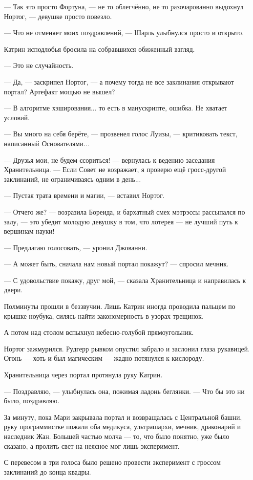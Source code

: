 --- Так это просто Фортуна, --- не то облегчённо, не то разочарованно выдохнул Нортог,
--- девушке просто повезло.

--- Что не отменяет моих поздравлений, --- Шарль улыбнулся просто и открыто.

Катрин исподлобья бросила на собравшихся обиженный взгляд.

--- Это не случайность.

--- Да, --- заскрипел Нортог, --- а почему тогда не все заклинания открывают портал? Артефакт мощью не вышел?

--- В алгоритме хэширования... то есть в манускрипте, ошибка. Не хватает условий.

--- Вы много на себя берёте, --- прозвенел голос Луизы, --- критиковать текст, написанный Основателями...

--- Друзья мои, не будем ссориться! --- вернулась к ведению заседания Хранительница.
--- Если Совет не возражает, я проверю ещё гросс-другой заклинаний, не ограничиваясь одним в день...

--- Пустая трата времени и магии, --- вставил Нортог.

--- Отчего же? --- возразила Бореида, и бархатный смех мэтрэссы рассыпался по залу,
--- это убедит молодую девушку в том, что лотерея --- не лучший путь к вершинам науки!

--- Предлагаю голосовать, --- уронил Джованни.

--- А может быть, сначала нам новый портал покажут? --- спросил мечник.

--- С удовольствие покажу, друг мой, --- сказала Хранительница и направилась к двери.

Полминуты прошли в беззвучии. Лишь Катрин иногда проводила пальцем по крышке ноубука,
силясь найти закономерность в узорах трещинок.

\emptypar

А потом над столом вспыхнул небесно-голубой прямоугольник.

Нортог зажмурился.
Рудгерр рывком опустил забрало и заслонил глаза рукавицей.
Огонь --- хоть и был магическим --- жадно потянулся к кислороду.

Хранительница через портал протянула руку Катрин.

--- Поздравляю, --- улыбнулась она, пожимая ладонь беглянки.
--- Что бы это ни было, поздравляю.

За минуту, пока Мари закрывала портал и возвращалась с Центральной башни,
руку программистке пожали оба медикуса, ультрашархи, мечник, драконарий и наследник Жан.
Большей частью молча --- то, что было понятно, уже было сказано,
а пролить свет на неясное мог лишь эксперимент.

С перевесом в три голоса было решено провести эксперимент с гроссом заклинаний до конца квадры.

\emptypar
